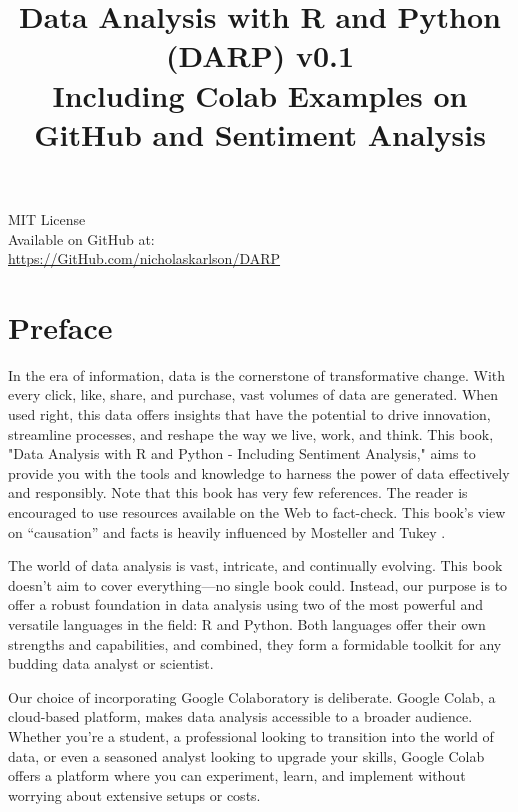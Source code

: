 \documentclass[a4paper,12pt]{book}
\begin{document}
\title{Data Analysis with R and Python (DARP) v0.1 \\ \large Including Colab Examples on GitHub and Sentiment Analysis}
\author{}
\date{}
\maketitle

\begin{center}
    MIT License \\
    Available on GitHub at: \\
    \url{https://GitHub.com/nicholaskarlson/DARP}
\end{center}

\tableofcontents

\chapter*{Preface}
In the era of information, data is the cornerstone of transformative change. With every click, like, share, and purchase, vast volumes of data are generated. When used right, this data offers insights that have the potential to drive innovation, streamline processes, and reshape the way we live, work, and think. This book, "Data Analysis with R and Python - Including Sentiment Analysis," aims to provide you with the tools and knowledge to harness the power of data effectively and responsibly. Note that this book has very few references. The reader is encouraged to use resources available on the Web to fact-check. This book's view on ``causation'' and facts is heavily influenced by Mosteller and Tukey \parencite{mosteller1977}.

The world of data analysis is vast, intricate, and continually evolving. This book doesn't aim to cover everything—no single book could. Instead, our purpose is to offer a robust foundation in data analysis using two of the most powerful and versatile languages in the field: R and Python. Both languages offer their own strengths and capabilities, and combined, they form a formidable toolkit for any budding data analyst or scientist.

Our choice of incorporating Google Colaboratory is deliberate. Google Colab, a cloud-based platform, makes data analysis accessible to a broader audience. Whether you're a student, a professional looking to transition into the world of data, or even a seasoned analyst looking to upgrade your skills, Google Colab offers a platform where you can experiment, learn, and implement without worrying about extensive setups or costs.
\end{document}
